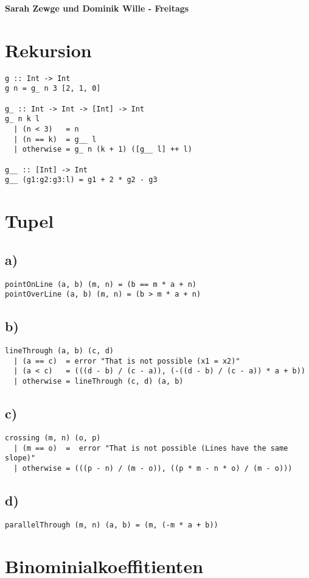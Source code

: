 \documentclass[a4paper, parskip=half]{scrartcl}
\begin{document}
\textbf{\LARGE Sarah Zewge und Dominik Wille - Freitags}
  \section{Rekursion}
\begin{verbatim}
g :: Int -> Int
g n = g_ n 3 [2, 1, 0]

g_ :: Int -> Int -> [Int] -> Int
g_ n k l
  | (n < 3)   = n
  | (n == k)  = g__ l
  | otherwise = g_ n (k + 1) ([g__ l] ++ l) 

g__ :: [Int] -> Int
g__ (g1:g2:g3:l) = g1 + 2 * g2 - g3
\end{verbatim}
  \section{Tupel}
\subsection*{a)}
\begin{verbatim}
pointOnLine (a, b) (m, n) = (b == m * a + n)
pointOverLine (a, b) (m, n) = (b > m * a + n)
\end{verbatim}
\subsection*{b)}
\begin{verbatim}
lineThrough (a, b) (c, d)
  | (a == c)  = error "That is not possible (x1 = x2)"
  | (a < c)   = (((d - b) / (c - a)), (-((d - b) / (c - a)) * a + b))
  | otherwise = lineThrough (c, d) (a, b)
\end{verbatim}
\subsection*{c)}
\begin{verbatim}
crossing (m, n) (o, p)
  | (m == o)  =  error "That is not possible (Lines have the same slope)"
  | otherwise = (((p - n) / (m - o)), ((p * m - n * o) / (m - o)))
\end{verbatim}
\subsection*{d)}
\begin{verbatim}
parallelThrough (m, n) (a, b) = (m, (-m * a + b))
\end{verbatim}
  \section{Binominialkoeffitienten}
\end{document}

